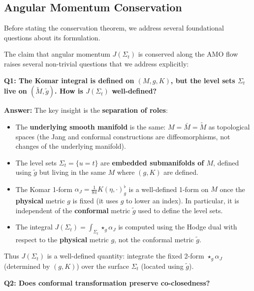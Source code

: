 \subsection{Angular Momentum Conservation}

Before stating the conservation theorem, we address several foundational questions about its formulation.

\begin{remark}\label{rem:J-foundations}
The claim that angular momentum $J(\Sigma_t)$ is conserved along the AMO flow raises several non-trivial questions that we address explicitly:

\textbf{Q1: The Komar integral is defined on $(M, g, K)$, but the level sets $\Sigma_t$ live on $(\tilde{M}, \tilde{g})$. How is $J(\Sigma_t)$ well-defined?}

\textbf{Answer:} The key insight is the \textbf{separation of roles}:
\begin{itemize}
    \item The \textbf{underlying smooth manifold} is the same: $M = \bar{M} = \tilde{M}$ as topological spaces (the Jang and conformal constructions are diffeomorphisms, not changes of the underlying manifold).
    \item The level sets $\Sigma_t = \{u = t\}$ are \textbf{embedded submanifolds of $M$}, defined using $\tilde{g}$ but living in the same $M$ where $(g, K)$ are defined.
    \item The Komar 1-form $\alpha_J = \frac{1}{8\pi}K(\eta, \cdot)^\flat_g$ is a well-defined 1-form on $M$ once the \textbf{physical} metric $g$ is fixed (it uses $g$ to lower an index). In particular, it is independent of the \textbf{conformal} metric $\tilde{g}$ used to define the level sets.
    \item The integral $J(\Sigma_t) = \int_{\Sigma_t} \star_g \alpha_J$ is computed using the Hodge dual with respect to the \textbf{physical} metric $g$, not the conformal metric $\tilde{g}$.
\end{itemize}
Thus $J(\Sigma_t)$ is a well-defined quantity: integrate the fixed 2-form $\star_g \alpha_J$ (determined by $(g, K)$) over the surface $\Sigma_t$ (located using $\tilde{g}$).

\textbf{Q2: Does conformal transformation preserve co-closedness?}


\end{remark}
